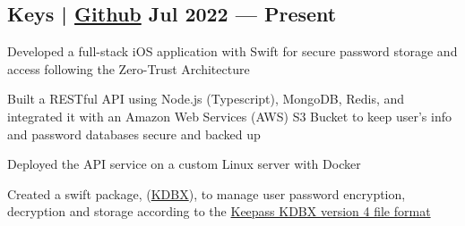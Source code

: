 \subsection{{Keys | \href{https://github.com/jerikjakobsen/keys}{Github} \hfill Jul 2022 --- Present}}
\begin{zitemize}
\item Developed a full-stack iOS application with Swift for secure password storage and access following the Zero-Trust Architecture
\item Built a RESTful API using Node.js (Typescript), MongoDB, Redis, and integrated it with an Amazon Web Services (AWS) S3 Bucket to keep user's info and password databases secure and backed up
\item Deployed the API service on a custom Linux server with Docker
\item Created a swift package, (\href{https://github.com/jerikjakobsen/kdbx}{KDBX}), to manage user password encryption, decryption and storage according to the  \href{https://keepass.info/help/kb/kdbx_4.html}{Keepass KDBX version 4 file format}
\end{zitemize}


